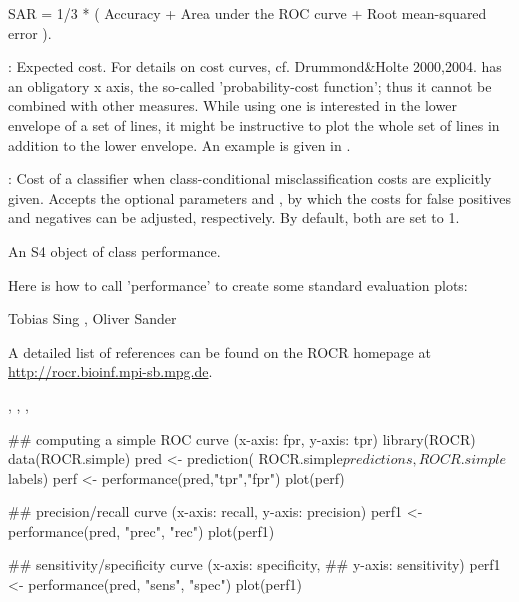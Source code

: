 \begin{Details}
{SAR = 1/3 * ( Accuracy + Area under the ROC curve + Root
mean-squared error ).
\item[\code{ecost}:] Expected cost. For details on cost curves,
cf. Drummond\&Holte 2000,2004.  has an obligatory x
axis, the so-called 'probability-cost function'; thus it cannot be
combined with other measures. While using  one is
interested in the lower envelope of a set of lines, it might be
instructive to plot the whole set of lines in addition to the lower
envelope. An example is given in .
\item[\code{cost}:] Cost of a classifier when
class-conditional misclassification costs are explicitly given.
Accepts the optional parameters  and
, by which the costs for false positives and
negatives can be adjusted, respectively. By default, both are set
to 1.
}
\end{Details}
\begin{Value}
An S4 object of class performance.
\end{Value}
\begin{Note}\relax
Here is how to call 'performance' to create some standard
evaluation plots:

\end{Note}
\begin{Author}\relax
Tobias Sing ,
Oliver Sander 
\end{Author}
\begin{References}\relax
A detailed list of references can be found on the ROCR
homepage at \url{http://rocr.bioinf.mpi-sb.mpg.de}.
\end{References}
\begin{SeeAlso}\relax
{}, ,
, 
\end{SeeAlso}
\begin{Examples}
\begin{ExampleCode}
## computing a simple ROC curve (x-axis: fpr, y-axis: tpr)
library(ROCR)
data(ROCR.simple)
pred <- prediction( ROCR.simple$predictions, ROCR.simple$labels)
perf <- performance(pred,"tpr","fpr")
plot(perf)

## precision/recall curve (x-axis: recall, y-axis: precision)
perf1 <- performance(pred, "prec", "rec")
plot(perf1)

## sensitivity/specificity curve (x-axis: specificity,
## y-axis: sensitivity)
perf1 <- performance(pred, "sens", "spec")
plot(perf1)
\end{ExampleCode}
\end{Examples}

